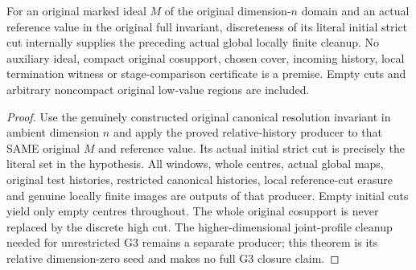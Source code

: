 \begin{theorem}
\label{hir:original-canonical-discrete-full-cut-cleanup}
\leanok
For an original marked ideal $M$ of the original dimension-$n$ domain and
an actual reference value in the original full invariant, discreteness of
its literal initial strict cut internally supplies the preceding actual
global locally finite cleanup. No auxiliary ideal, compact original
cosupport, chosen cover, incoming history, local termination witness or
stage-comparison certificate is a premise. Empty cuts and arbitrary
noncompact original low-value regions are included.
\end{theorem}
\begin{proof}
Use the genuinely constructed original canonical resolution invariant in
ambient dimension $n$ and apply the proved relative-history producer to
that SAME original $M$ and reference value. Its actual initial strict cut
is precisely the literal set in the hypothesis. All windows, whole centres,
actual global maps, original test histories, restricted canonical histories,
local reference-cut erasure and genuine locally finite images are outputs
of that producer. Empty initial cuts yield only empty centres throughout.
The whole original cosupport is never replaced by the discrete high cut.
The higher-dimensional joint-profile cleanup needed for unrestricted G3
remains a separate producer; this theorem is its relative dimension-zero
seed and makes no full G3 closure claim.
\end{proof}
